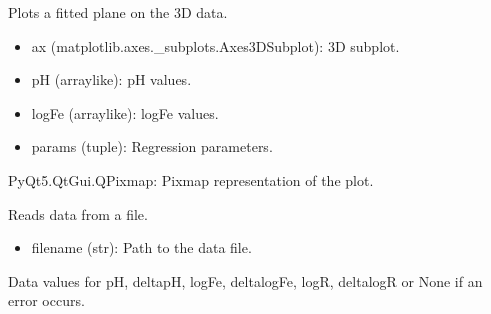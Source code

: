 \documentclass[a4paper,10pt,english]{sphinxmanual}
\begin{document}
\begin{fulllineitems}
\begin{fulllineitems}
\label{\detokenize{utils:src.utils.plane3D_plot.Plane3DPlotter.plot_fitted_plane}}
\pysigstartsignatures
{}
\pysigstopsignatures
\sphinxAtStartPar
Plots a fitted plane on the 3D data.
\begin{description}
\begin{itemize}
\item {} 
\sphinxAtStartPar
ax (matplotlib.axes.\_subplots.Axes3DSubplot): 3D subplot.

\item {} 
\sphinxAtStartPar
pH (array\sphinxhyphen{}like): pH values.

\item {} 
\sphinxAtStartPar
logFe (array\sphinxhyphen{}like): logFe values.

\item {} 
\sphinxAtStartPar
params (tuple): Regression parameters.

\end{itemize}

\sphinxAtStartPar
PyQt5.QtGui.QPixmap: Pixmap representation of the plot.

\end{description}

\end{fulllineitems}


\begin{fulllineitems}
\label{\detokenize{utils:src.utils.plane3D_plot.Plane3DPlotter.read_data}}
\pysigstartsignatures
{}
\pysigstopsignatures
\sphinxAtStartPar
Reads data from a file.
\begin{description}
\begin{itemize}
\item {} 
\sphinxAtStartPar
filename (str): Path to the data file.

\end{itemize}

\sphinxAtStartPar
Data values for pH, deltapH, logFe, deltalogFe, logR, deltalogR or None if an error occurs.

\end{description}

\end{fulllineitems}


\end{fulllineitems}
\end{document}
